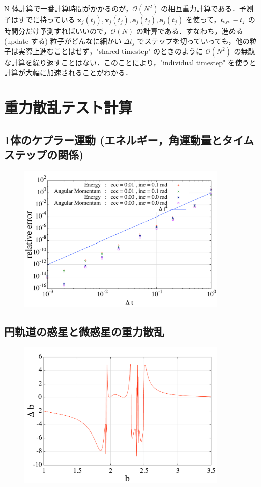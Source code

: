 \documentclass[11pt,a4paper,oneside,onecolumn]{jarticle}
\begin{document}
N 体計算で一番計算時間がかかるのが，$\mathcal{O} (N^2)$ の相互重力計算である．予測子はすでに持っている ${\bm x}_j (t_j), {\bm v}_j (t_j), {\bm a}_j (t_j), \dot{{\bm a}}_j (t_j)$ を使って，$t_{{\rm sys}} - t_j$ の時間分だけ予測すればいいので，$\mathcal{O} (N)$ の計算である．すなわち，進める (update する) 粒子がどんなに細かい $\Delta t_j$ でステップを切っていっても，他の粒子は実際上進むことはせず，"shared timestep" のときのように $\mathcal{O} (N^2)$ の無駄な計算を繰り返すことはない．このことにより，"individual timestep" を使うと計算が大幅に加速されることがわかる．

\section{重力散乱テスト計算}
\subsection{1体のケプラー運動 (エネルギー，角運動量とタイムステップの関係)}

\begin{figure}[H]
\centering
\includegraphics[width=10cm]{./image/relative_error.pdf}
\caption{\label{}}
\end{figure}

\subsection{円軌道の惑星と微惑星の重力散乱}

\begin{figure}[H]
\centering
\includegraphics[width=10cm]{./image/planetesimal_delta_b.pdf}
\caption{\label{}}
\end{figure}
\end{document}
